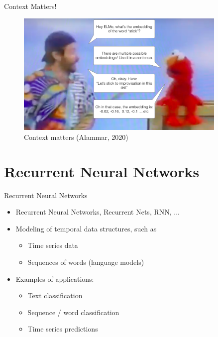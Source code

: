 \documentclass[10pt]{beamer}
\begin{document}
\begin{frame}{Context Matters!}

\begin{figure}[h]
\centering
\includegraphics[width=0.9\textwidth]{fig/elmo-embedding-robin-williams.png}
\caption{Context matters (Alammar, 2020)}
\end{figure}

\end{frame}


\section{Recurrent Neural Networks}

\begin{frame}{Recurrent Neural Networks}

\begin{itemize}
\item Recurrent Neural Networks, Recurrent Nets, RNN, ...
\item Modeling of {\color{uured} temporal data structures}, such as
\begin{itemize}
\item Time series data
\item Sequences of words (language models)
\end{itemize}
\pause
\item Examples of applications:
\begin{itemize}
\item Text classification
\item Sequence / word classification
\item Time series predictions
\end{itemize}

\end{itemize}

\end{frame}
\end{document}
